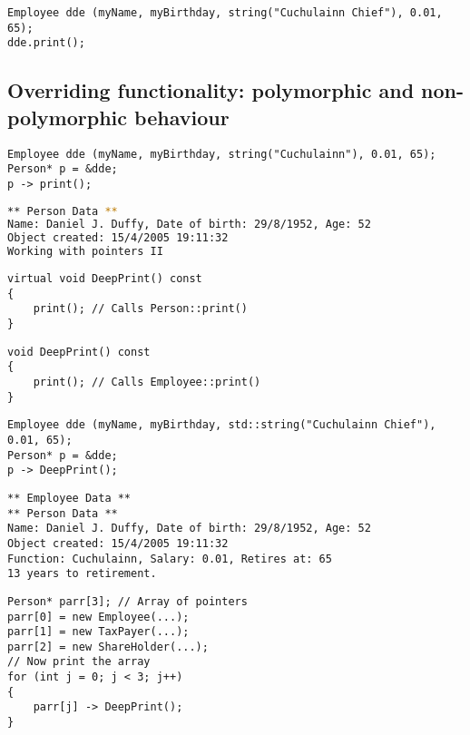 \begin{lstlisting}
Employee dde (myName, myBirthday, string("Cuchulainn Chief"), 0.01, 65);
dde.print();
\end{lstlisting}



\subsection{Overriding functionality: polymorphic and non-polymorphic behaviour}

\begin{lstlisting}
Employee dde (myName, myBirthday, string("Cuchulainn"), 0.01, 65);
Person* p = &dde;
p -> print();
\end{lstlisting}

\begin{lstlisting}[language=bash]
** Person Data **
Name: Daniel J. Duffy, Date of birth: 29/8/1952, Age: 52
Object created: 15/4/2005 19:11:32
Working with pointers II
\end{lstlisting}

\begin{lstlisting}
virtual void DeepPrint() const
{
	print(); // Calls Person::print()
}
\end{lstlisting}

\begin{lstlisting}
void DeepPrint() const
{
	print(); // Calls Employee::print()
}
\end{lstlisting}

\begin{lstlisting}
Employee dde (myName, myBirthday, std::string("Cuchulainn Chief"), 0.01, 65);
Person* p = &dde;
p -> DeepPrint();
\end{lstlisting}

\begin{lstlisting}
** Employee Data **
** Person Data **
Name: Daniel J. Duffy, Date of birth: 29/8/1952, Age: 52
Object created: 15/4/2005 19:11:32
Function: Cuchulainn, Salary: 0.01, Retires at: 65
13 years to retirement.
\end{lstlisting}

\begin{lstlisting}
Person* parr[3]; // Array of pointers
parr[0] = new Employee(...);
parr[1] = new TaxPayer(...);
parr[2] = new ShareHolder(...);
// Now print the array
for (int j = 0; j < 3; j++)
{
	parr[j] -> DeepPrint();
}
\end{lstlisting}

